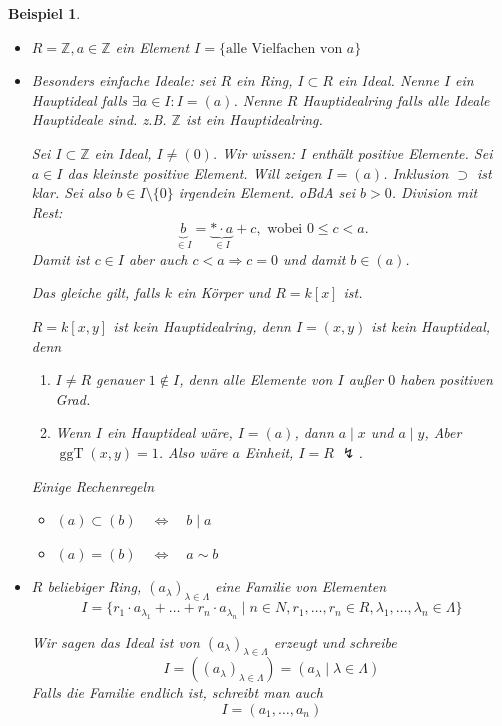 \documentclass[a4paper,12pt,numbers=noenddot,parskip=full]{scrartcl}
\newcommand{\setZ}{\mathbb{Z}}
\theoremstyle{dotless}
\newtheorem{example}[theorem]{Beispiel}
\theoremstyle{remark}
\begin{document}
	\begin{example}
		\begin{itemize}
			\item $R = \setZ, a \in \setZ$ ein Element $I = \{ \text{alle Vielfachen von $a$} \}$
			\item Besonders einfache Ideale: sei $R$ ein Ring, $I \subset R$ ein Ideal. Nenne $I$ ein Hauptideal falls $\exists a \in I: I = (a)$. Nenne $R$ Hauptidealring falls alle Ideale Hauptideale sind. z.B. $\setZ$ ist ein Hauptidealring.
			
			Sei $I \subset \setZ$ ein Ideal, $I \neq (0)$. Wir wissen: $I$ enthält positive Elemente. Sei $a \in I$ das kleinste positive Element. Will zeigen $I = (a)$. Inklusion $\supset$ ist klar. Sei also $b \in I \setminus \{ 0 \}$ irgendein Element. oBdA sei $b > 0$. Division mit Rest:
			\begin{equation*}
				\underbrace{b}_{\in I} = \underbrace{* \cdot a}_{\in I} + c, \text{ wobei } 0 \leq c < a.
			\end{equation*}
			Damit ist $c \in I$ aber auch $c < a \Rightarrow c = 0$ und damit $b \in (a)$.
			
			Das gleiche gilt, falls $k$ ein Körper und $R = k[x]$ ist.
			
			$R = k[x,y]$ ist kein Hauptidealring, denn $I = (x,y)$ ist kein Hauptideal, denn
			\begin{enumerate}
				\item $I \neq R$ genauer $1 \notin I$, denn alle Elemente von $I$ außer $0$ haben positiven Grad.
				\item Wenn $I$ ein Hauptideal wäre, $I = (a)$, dann $a \mid x$ und $a \mid y$, Aber $\operatorname{ggT}(x,y) = 1$. Also wäre $a$ Einheit, $I = R$ $\lightning$.
			\end{enumerate}
		
			Einige Rechenregeln
			\begin{itemize}
				\item $(a) \subset (b) \quad\Leftrightarrow\quad b \mid a$
				\item $(a) = (b) \quad\Leftrightarrow\quad a \sim b$
			\end{itemize}
						
			\item $R$ beliebiger Ring, $(a_\lambda)_{\lambda \in \Lambda}$ eine Familie von Elementen
			\begin{equation*}
				I = \{ r_1 \cdot a_{\lambda_1} + \dots + r_n \cdot a_{\lambda_n} \mid n \in N, r_1, \dots, r_n \in R, \lambda_1, \dots, \lambda_n \in \Lambda \}
			\end{equation*}
			
			Wir sagen das Ideal ist von $(a_\lambda)_{\lambda \in \Lambda}$ erzeugt und schreibe
			\begin{equation*}
				I = ((a_\lambda)_{\lambda \in \Lambda}) = (a_\lambda \mid \lambda \in \Lambda)
			\end{equation*}
			Falls die Familie endlich ist, schreibt man auch
			\begin{equation*}
				I = (a_1, \dots, a_n)
			\end{equation*}
		\end{itemize}
	\end{example}
\end{document}
